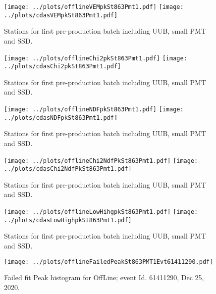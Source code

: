 \documentclass[twoside, final, 10pt]{articleMine}
\begin{document}
\begin{figure}[!tbh]
  \centering
  \subfigure
  {
    \texttt{[image: ../plots/offlineVEMpkSt863Pmt1.pdf]}
    \texttt{[image: ../plots/cdasVEMpkSt863Pmt1.pdf]}
  }
  \caption{Stations for first pre-production batch including UUB, small PMT and SSD.}
  \label{figPkVemserie}
\end{figure}
\clearpage

\begin{figure}[!tbh]
  \centering
  \subfigure
  {
    \texttt{[image: ../plots/offlineChi2pkSt863Pmt1.pdf]}
    \texttt{[image: ../plots/cdasChi2pkSt863Pmt1.pdf]}
  }
  \caption{Stations for first pre-production batch including UUB, small PMT and SSD.}
  \label{figPkNdfserie}
\end{figure}

\begin{figure}[!tbh]
  \centering
  \subfigure
  {
    \texttt{[image: ../plots/offlineNDFpkSt863Pmt1.pdf]}
    \texttt{[image: ../plots/cdasNDFpkSt863Pmt1.pdf]}
  }
  \caption{Stations for first pre-production batch including UUB, small PMT and SSD.}
  \label{figPkNdfserie}
\end{figure}


\begin{figure}[!tbh]
  \centering
  \subfigure
  {
    \texttt{[image: ../plots/offlineChi2NdfPkSt863Pmt1.pdf]}
    \texttt{[image: ../plots/cdasChi2NdfPkSt863Pmt1.pdf]}
  }
  \caption{Stations for first pre-production batch including UUB, small PMT and SSD.}
  \label{figPkChi2Ndfserie}
\end{figure}
\clearpage

\begin{figure}[!tbh]
  \centering
  \subfigure
  {
    \texttt{[image: ../plots/offlineLowHihgpkSt863Pmt1.pdf]}
    \texttt{[image: ../plots/cdasLowHighpkSt863Pmt1.pdf]}
  }
  \caption{Stations for first pre-production batch including UUB, small PMT and SSD.}
  \label{figPkLowHigh}
\end{figure}


\begin{figure}[!tbh]
  \centering
  \subfigure
  {
    \texttt{[image: ../plots/offlineFailedPeakSt863PMT1Evt61411290.pdf]}
  }
  \caption{Failed fit Peak histogram for OffLine; event Id. 61411290, Dec 25, 2020.}
  \label{figPkFailsfit}
\end{figure}
\clearpage
\end{document}
